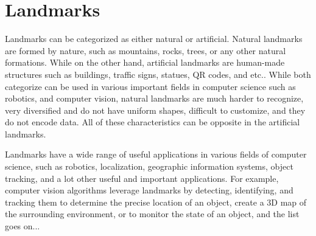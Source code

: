 \section{Landmarks}

Landmarks can be categorized as either natural or artificial. Natural landmarks are formed by nature, such as mountains, rocks, trees, or any other natural formations. While on the other hand, artificial landmarks are human-made structures such as buildings, traffic signs, statues, QR codes, and etc.. While both categorize can be used in various important fields in computer science such as robotics, and computer vision, natural landmarks are much harder to recognize, very diversified and do not have uniform shapes, difficult to customize, and they do not encode data. All of these characteristics can be opposite in the artificial landmarks.

Landmarks have a wide range of useful applications in various fields of computer science, such as robotics, localization, geographic information systems, object tracking, and a lot other useful and important applications. For example, computer vision algorithms leverage landmarks by detecting, identifying, and tracking them to determine the precise location of an object, create a 3D map of the surrounding environment, or to monitor the state of an object, and the list goes on...